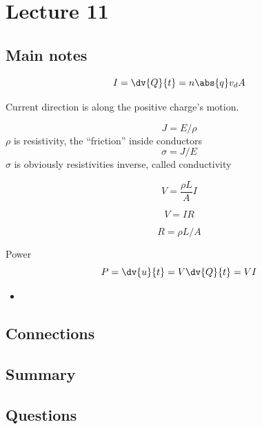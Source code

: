 \section{Lecture 11}
\subsection{Main notes}

\[
I = \dv{Q}{t} = n \abs{q} v_d A
  \]

  Current direction is along the positive charge's motion.

\[
J = E/ \rho
  \]
$\rho$ is resistivity, the ``friction'' inside conductors
\[
\sigma = J/E
  \]
  $\sigma$ is obviously resistivities inverse, called conductivity


\[
V= \frac{\rho L}{A}I
  \]

\[
V=IR
\]

\[
R = \rho L/A
  \]

  Power
\[
P = \dv{u}{t}= V \dv{Q}{t} = VI
  \]
\begin{itemize}
	\item
\end{itemize}


\subsection{Connections}


\subsection{Summary}


\subsection{Questions}
